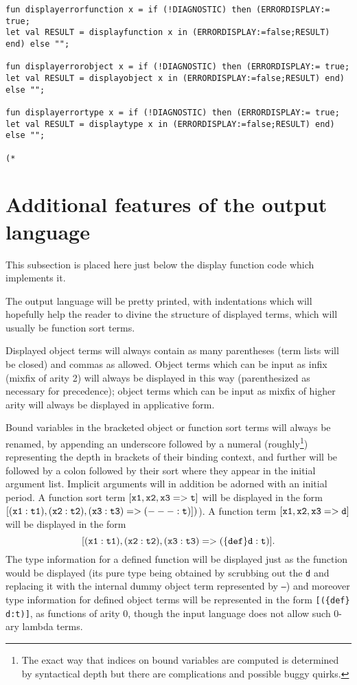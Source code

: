 \documentclass[12pt]{article}
\begin{document}
\begin{verbatim}
fun displayerrorfunction x = if (!DIAGNOSTIC) then (ERRORDISPLAY:= true; 
let val RESULT = displayfunction x in (ERRORDISPLAY:=false;RESULT) end) else "";

fun displayerrorobject x = if (!DIAGNOSTIC) then (ERRORDISPLAY:= true; 
let val RESULT = displayobject x in (ERRORDISPLAY:=false;RESULT) end) else "";

fun displayerrortype x = if (!DIAGNOSTIC) then (ERRORDISPLAY:= true; 
let val RESULT = displaytype x in (ERRORDISPLAY:=false;RESULT) end) else "";

(*

\end{verbatim}

\newpage

\section{Additional features of the output language}

This subsection is placed here just below the display function code which implements it.

The output language will be pretty printed, with indentations which will hopefully help the reader to divine the structure of displayed terms, which will usually
be function sort terms.

Displayed object terms will always contain as many parentheses (term lists will be closed) and commas as allowed.  Object terms which can be input as infix (mixfix of arity 2) will always be displayed in this way (parenthesized as necessary for precedence);  object terms which can be input as mixfix of higher arity will always be displayed in applicative form.

Bound variables in the bracketed object or function sort terms will always be renamed, by appending an underscore followed by a numeral (roughly\footnote{The exact way that indices on bound variables are computed is determined by syntactical depth but there are complications and possible buggy quirks.}) representing the depth in brackets of their binding context, and further will be followed by a colon followed by their sort where they appear in the initial argument list.   Implicit arguments will in addition be adorned with an initial period.  A function sort term ${\mathbb {\tt [x1, x2, x3 => t]}}$ will 
be displayed in the form ${\mathbb {\tt [(x1:t1), (x2:t2), (x3:t3) => (--- :t)]}})$).  A function term $\mathbb{{\tt [x1, x2, x3 => d]}}$ will be displayed in the form $${\mathbb{\tt [(x1:t1), (x2:t2), (x3:t3) => (\{def\} d : t)]}}.$$  The type information for a defined function will be displayed just as the function would be displayed (its pure type being obtained by scrubbing out the {\tt d} and replacing it with the internal dummy object term
represented by {\tt ---}) and moreover type information for defined object terms will be represented in the form {\tt [(\{def\} d:t)]}, as functions of arity 0, though the input language does not allow such 0-ary lambda terms. 
\end{document}
